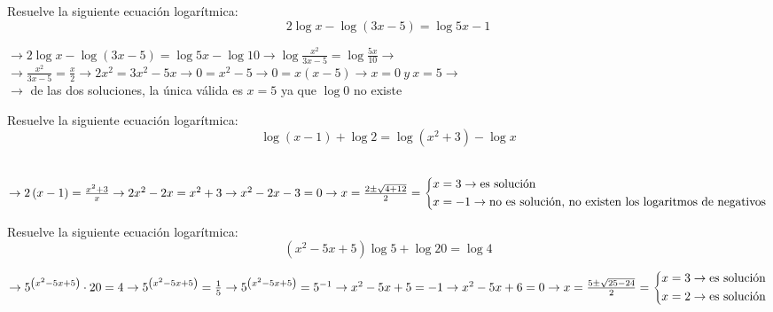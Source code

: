\documentclass[addpoints,spanish, 12pt,a4paper]{exam}
\begin{document}
\begin{questions}

\question[1] Resuelve la siguiente ecuación logarítmica:$$2\log x- \log{\left(3x-5\right)}=\log{5x} - 1$$ 
\begin{solution} $\to 2\log x- \log{\left(3x-5\right)}=\log{5x} - \log {10} \to \log {\frac{x^2}{3x-5}}=\log {\frac{5x}{10}}\to$ \\
$\to \frac{x^2}{3x-5}=\frac{x}{2}\to2x^2=3x^2-5x\to 0=x^2-5 \to 0=x\left(x-5\right)\to x=0 \ y \ x=5 \to$ \\ $\to$ de las dos soluciones, la única válida es $x=5$ ya que $\log 0$ no existe \end{solution}

\question[1] Resuelve la siguiente ecuación logarítmica:$$\log {\left(x-1\right)}+ \log{2}=\log{\left(x^2+3\right)} - \log x$$ \\

\begin{solution} $\to 2\left(x-1\right)=\frac{x^2+3}{x}\to 2x^2 -2x=x^2+3\to x^2-2x-3=0 \to x=\frac{2\pm\sqrt{4+12}}{2}=\left\lbrace \begin{gathered}
	  x=3  \to \textup{es solución} \hfill\\
	  x=-1  \to \textup{no es solución, no existen los logaritmos de negativos}
	\end{gathered} \right. $  \end{solution}

\addpoints

\question[1] Resuelve la siguiente ecuación logarítmica:$$\left(x^2-5x+5\right)\log 5 + \log{20}=\log 4$$

\begin{solution} $\to 5^{\left(x^2-5x+5\right)}\cdot20=4 \to 5^{\left(x^2-5x+5\right)}=\frac{1}{5} \to 5^{\left(x^2-5x+5\right)}=5^{-1}\to x^2-5x+5 = -1 \to x^2-5x+6=0 \to x=\frac{5 \pm \sqrt{25-24}}{2}=\left\lbrace \begin{gathered}
	  x=3  \to \textup{es solución} \hfill\\
	  x=2  \to \textup{es solución}
	\end{gathered} \right. $  \end{solution}


\end{questions}
\end{document}
